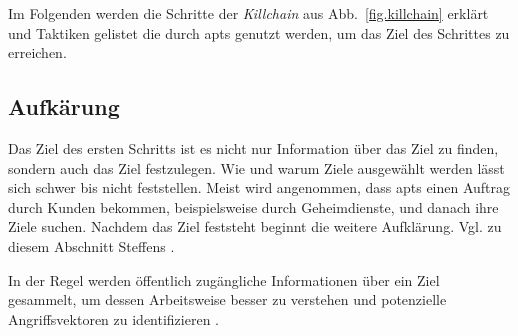 \documentclass[conference]{IEEEtran}
\begin{document}
Im Folgenden werden die Schritte der \textit{Killchain} aus Abb.~\ref{fig.killchain} erklärt und Taktiken gelistet die durch \acp{apt} genutzt werden, um das Ziel des Schrittes zu erreichen.

\subsection{Aufkärung}

Das Ziel des ersten Schritts ist es nicht nur Information über das Ziel zu finden, sondern auch das Ziel festzulegen.
Wie und warum Ziele ausgewählt werden lässt sich schwer bis nicht feststellen.
Meist wird angenommen, dass \acp{apt} einen Auftrag durch Kunden bekommen, beispielsweise durch Geheimdienste, und danach ihre Ziele suchen.
Nachdem das Ziel feststeht beginnt die weitere Aufklärung.
Vgl. zu diesem Abschnitt Steffens \cite[S.~10ff]{Steffens2020}.

In der Regel werden öffentlich zugängliche Informationen über ein Ziel gesammelt, um dessen Arbeitsweise besser zu verstehen und potenzielle Angriffsvektoren zu identifizieren \cite{Cole2013}.
\end{document}
